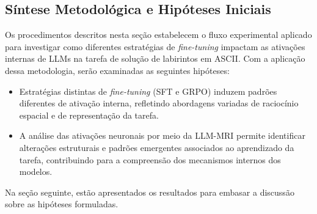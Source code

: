 \subsection{Síntese Metodológica e Hipóteses Iniciais}

Os procedimentos descritos nesta seção estabelecem o fluxo experimental aplicado para investigar como diferentes estratégias de \textit{fine-tuning} impactam as ativações internas de LLMs na tarefa de solução de labirintos em ASCII. Com a aplicação dessa metodologia, serão examinadas as seguintes hipóteses:

\begin{itemize}
    \item[H1:] Estratégias distintas de \textit{fine-tuning} (SFT e GRPO) induzem padrões diferentes de ativação interna, refletindo abordagens variadas de raciocínio espacial e de representação da tarefa.
    \item[H2:] A análise das ativações neuronais por meio da LLM-MRI permite identificar alterações estruturais e padrões emergentes associados ao aprendizado da tarefa, contribuindo para a compreensão dos mecanismos internos dos modelos.
\end{itemize}

Na seção seguinte, estão apresentados os resultados para embasar a discussão sobre as hipóteses formuladas.
